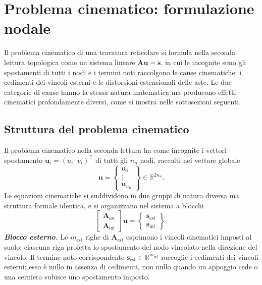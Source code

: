 \section{Problema cinematico: formulazione nodale}
\label{sec:cinematica_reticolari}

Il problema cinematico di una travatura reticolare
si formula nella seconda lettura topologica
come un sistema lineare $\bm{A}\bm{u} = \bm{s}$,
in cui le incognite sono gli spostamenti di tutti
i nodi e i termini noti raccolgono le cause cinematiche: i cedimenti dei vincoli esterni e
le distorsioni estensionali delle aste. Le due
categorie di cause hanno la stessa natura matematica
ma producono effetti cinematici profondamente diversi,
come si mostra nelle sottosezioni seguenti.


\subsection{Struttura del problema cinematico}
\label{subsec:struttura_cinematica}

Il problema cinematico nella seconda lettura ha come
incognite i vettori spostamento $\bm{u}_i = (u_i\;\;v_i)^\top$
di tutti gli $n_n$ nodi, raccolti nel vettore globale
\begin{equation}\label{eq:vettore_u_reticolare}
	\bm{u} = 
	\left\{
	\begin{array}{c} \bm{u}_1 \\ \vdots \\ \bm{u}_{n_n} 
	\end{array}
	\right\} \in \mathbb{R}^{2n_n}.
\end{equation}
Le equazioni cinematiche si suddividono in due gruppi
di natura diversa ma struttura formale identica,
e si organizzano nel sistema a blocchi
\begin{equation}\label{eq:Au=s}
	\begin{bmatrix} \bm{A}_\text{est} \\ \bm{A}_\text{int} 
	\end{bmatrix}\bm{u} =
	\left\{
	\begin{array}{c} \bm{s}_\text{est} \\ \bm{s}_\text{int} 
	\end{array}
	\right\}.
\end{equation}
\textbf{\textit{Blocco esterno.}}
Le $m_\text{est}$ righe di $\bm{A}_\text{est}$ esprimono
i vincoli cinematici imposti al suolo: ciascuna riga
proietta lo spostamento del nodo vincolato nella
direzione del vincolo. Il termine noto corrispondente
$\bm{s}_\text{est} \in \mathbb{R}^{m_\text{est}}$
raccoglie i cedimenti dei vincoli esterni: esso è
nullo in assenza di cedimenti, non nullo quando
un appoggio cede o una cerniera subisce uno
spostamento imposto.

